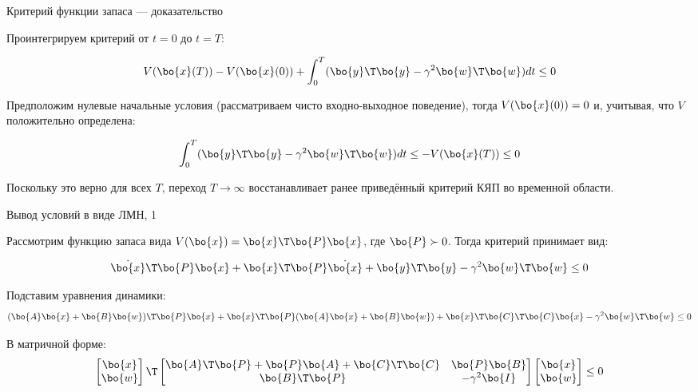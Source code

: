 \documentclass{beamer}
\begin{document}
	\begin{frame}{Критерий функции запаса — доказательство}
		\begin{flushleft}
			
			Проинтегрируем критерий от $t=0$ до $t = T$:
			
			\begin{equation}
				V(\bo{x}(T)) - V(\bo{x}(0)) + \int_{0}^{T}( \bo{y}\T \bo{y} - \gamma^2 \bo{w}\T \bo{w}) dt \leq 0
			\end{equation}
			
			Предположим нулевые начальные условия (рассматриваем чисто входно-выходное поведение), тогда $V(\bo{x}(0)) = 0$ и, учитывая, что $V$ положительно определена:
			
			\begin{equation}
				\int_{0}^{T} (\bo{y}\T \bo{y} - \gamma^2 \bo{w}\T \bo{w})dt  \leq  -V(\bo{x}(T)) \leq 0
			\end{equation}
			
			Поскольку это верно для всех $T$, переход $T \rightarrow \infty$ восстанавливает ранее приведённый критерий КЯП во временной области.
			
		\end{flushleft}
	\end{frame}
	
	
	\begin{frame}{Вывод условий в виде ЛМН, 1}
		\begin{flushleft}
			
			Рассмотрим функцию запаса вида $V( \bo{x}) =  \bo{x}\T  \bo{P}  \bo{x}$, где $ \bo{P} \succ 0$. Тогда критерий принимает вид:
			
			\begin{align}
				\dot{\bo{x}}\T  \bo{P}  \bo{x} + \bo{x}\T  \bo{P}  \dot{\bo{x}} + \bo{y}\T \bo{y} - \gamma^2 \bo{w}\T \bo{w} \leq 0
			\end{align}
			
			Подставим уравнения динамики:
			\begin{align*}
				(\bo{A}\bo{x}+\bo{B}\bo{w})\T  \bo{P}  \bo{x} + \bo{x}\T  \bo{P} (\bo{A}\bo{x}+\bo{B}\bo{w}) + \bo{x}\T  \bo{C}\T \bo{C}\bo{x} - \gamma^2 \bo{w}\T \bo{w} \leq 0
			\end{align*}
			
			В матричной форме:
			\begin{align}
				\begin{bmatrix}
					\bo{x} \\ \bo{w}
				\end{bmatrix}\T
				\begin{bmatrix}
					\bo{A}\T\bo{P}+\bo{P}\bo{A}+\bo{C}\T\bo{C} & \bo{P}\bo{B} \\
					\bo{B}\T\bo{P}  & -\gamma^2 \bo{I}
				\end{bmatrix}
				\begin{bmatrix}
					\bo{x} \\ \bo{w}
				\end{bmatrix}
				\leq 0
			\end{align}
			
			
			
		\end{flushleft}
	\end{frame}
	
\end{document}
